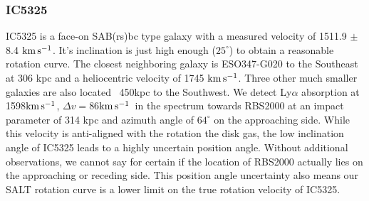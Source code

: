 \documentclass[iop]{emulateapj-rtx4}
\newcommand{\kms}{$\rm km\, s^{-1}$}
\begin{document}
%


\subsubsection{IC5325}
IC5325 is a face-on SAB(rs)bc type galaxy with a measured velocity of 1511.9 $\pm$ 8.4 \kms. It's inclination is just high enough ($25^{\circ}$) to obtain a reasonable rotation curve. The closest neighboring galaxy is ESO347-G020 to the Southeast at 306 kpc and a heliocentric velocity of 1745 \kms. Three other much smaller galaxies are also located ~450kpc to the Southwest. We detect Ly$\alpha$ absorption at 1598\kms, $\Delta v = 86$\kms~in the spectrum towards RBS2000 at an impact parameter of 314 kpc and azimuth angle of $64^{\circ}$ on the approaching side. While this velocity is anti-aligned with the rotation the disk gas, the low inclination angle of IC5325 leads to a highly uncertain position angle. Without additional observations, we cannot say for certain if the location of RBS2000 actually lies on the approaching or receding side. This position angle uncertainty also means our SALT rotation curve is a lower limit on the true rotation velocity of IC5325.



 

%
\end{document}
